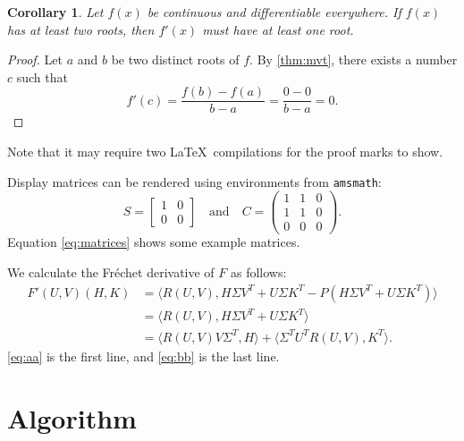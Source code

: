 \documentclass[10pt,reqno,final]{article}
\theoremstyle{plain}
\newtheorem{corollary}{Corollary}[section]
\theoremstyle{definition}
\theoremstyle{remark}
\begin{document}

\begin{corollary}\label{cor:a}
  Let $f(x)$ be continuous and differentiable everywhere. If $f(x)$
  has at least two roots, then $f'(x)$ must have at least one root.
\end{corollary}
\begin{proof}
  Let $a$ and $b$ be two distinct roots of $f$.
  By \ref{thm:mvt}, there exists a number $c$ such that
  \begin{equation*}
    f'(c) = \frac{f(b)-f(a)}{b-a} = \frac{0-0}{b-a} = 0.
  \end{equation*}
\end{proof}

Note that it may require two \LaTeX\ compilations for the proof marks
to show.

Display matrices can be rendered using environments from \texttt{amsmath}:
\begin{equation}\label{eq:matrices}
S=\begin{bmatrix}1&0\\0&0\end{bmatrix}
\quad\text{and}\quad
C=\begin{pmatrix}1&1&0\\1&1&0\\0&0&0\end{pmatrix}.
\end{equation}
Equation \ref{eq:matrices} shows some example matrices.

We calculate the Fr\'{e}chet derivative of $F$ as follows:
\begin{subequations}
\begin{align}
  F'(U,V)(H,K)
  &= \langle R(U,V),H\Sigma V^{T} + U\Sigma K^{T} -
  P(H\Sigma V^{T} + U\Sigma K^{T})\rangle \label{eq:aa} \\
  &= \langle R(U,V),H\Sigma V^{T} + U\Sigma K^{T}\rangle
  \nonumber \\
  &= \langle R(U,V)V\Sigma^{T},H\rangle +
  \langle \Sigma^{T}U^{T}R(U,V),K^{T}\rangle. \label{eq:bb}
\end{align}
\end{subequations}
\ref{eq:aa} is the first line, and \ref{eq:bb} is the last line.

\section{Algorithm}
\label{sec:alg}
\end{document}
